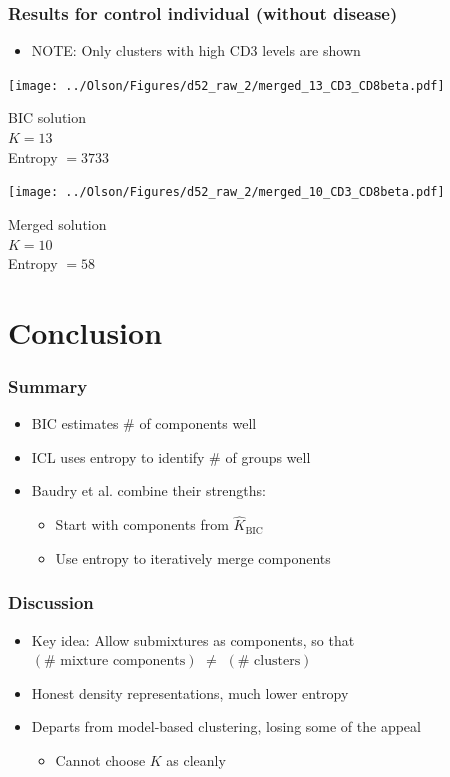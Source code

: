 \documentclass[mathserif,compress]{beamer}
\newcommand*\estim[1]{\widehat{#1}}
\renewcommand\;{\,}
\begin{document}
\begin{frame}\frametitle{Results for control individual (without disease)}
\begin{itemize}
\medskip
\item[]
\alert{NOTE}: Only clusters with high CD3 levels are shown
\end{itemize}
\begin{center}
\begin{minipage}{0.4\linewidth}
\texttt{[image: ../Olson/Figures/d52\_raw\_2/merged\_13\_CD3\_CD8beta.pdf]}
\begin{center}
BIC solution
\\
$K = 13$
\\
Entropy $ = 3733$
\end{center}
\end{minipage}
\hfill
\begin{minipage}{0.4\linewidth}
\texttt{[image: ../Olson/Figures/d52\_raw\_2/merged\_10\_CD3\_CD8beta.pdf]}
\begin{center}
Merged solution
\\
$K = 10$
\\
Entropy $= 58$
\end{center}
\end{minipage}
\end{center}
\end{frame}

\section{Conclusion}
\begin{frame}\frametitle{Summary}
\begin{itemize}
\item[]
BIC estimates \# of components well 
\bigskip
\item[]
ICL uses entropy to identify \# of groups well
\bigskip
\item[]
Baudry et al. combine their strengths:
\begin{itemize}
\bigskip
\item
Start with components from $\estim K_\text{BIC}$
\bigskip
\item
Use entropy to iteratively merge components
\end{itemize}
\end{itemize}
\end{frame}

\begin{frame}\frametitle{Discussion}
\begin{itemize}
\item[]
\alert{Key idea:} Allow submixtures as components, so that $\left(\# \text{ mixture components}\right)$ 
$\ne$ 
$\left(\# \text{ clusters} \right)$
\bigskip
\item[]
Honest density representations, much lower entropy
\bigskip
\item[]
Departs from model-based clustering, losing some of the appeal
\bigskip
\begin{itemize}
\item
Cannot choose $K$ as cleanly
\end{itemize}
\end{itemize}
\end{frame}
\end{document}
